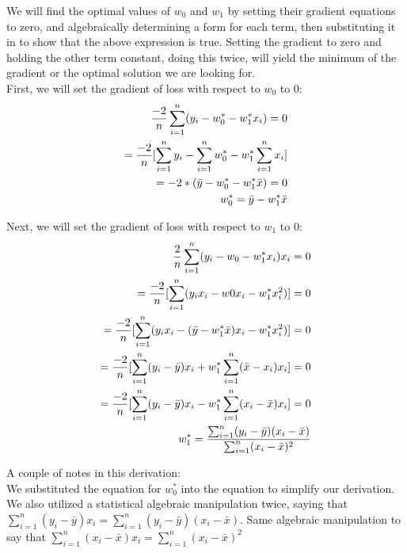 \documentclass[12pt]{article}
\begin{document}
\begin{enumerate}
\begin{enumerate}
We will find the optimal values of $w_0$ and $w_1$ by setting their gradient equations to zero, and algebraically determining a form for each term, then substituting it in to show that the above expression is true. Setting the gradient to zero and holding the other term constant, doing this twice, will yield the minimum of the gradient or the optimal solution we are looking for. \\ 

First, we will set the gradient of loss with respect to $w_0$ to 0: \\ 
\begin{align}
  \frac{-2}{n} \sum_{i=1}^{n} (y_i - w_0^* - w_1^*x_i) = 0 \notag \\ 
  = \frac{-2}{n} [\sum_{i=1}^{n} y_i - \sum_{i=1}^{n} w_0^* - w_1^* \sum_{i=1}^{n} x_i] \notag \\
  = -2 * (\bar{y} - w_0^* - w_1^* \bar{x}) = 0 \notag \\ 
  w_0^* = \bar{y} - w_1^* \bar{x} \notag
\end{align}

Next, we will set the gradient of loss with respect to $w_1$ to 0: \\ 
\begin{align}
  \frac{2}{n} \sum_{i=1}^{n} (y_i - w_0 - w_1^*x_i) x_i = 0 \notag \\ 
  = \frac{-2}{n} [\sum_{i=1}^{n} (y_ix_i - w0x_i - w_1^*x_i^2)] = 0 \notag \\ 
  = \frac{-2}{n} [\sum_{i=1}^{n} (y_ix_i - (\bar{y} - w_1^* \bar{x}) x_i - w_1^*x_i^2)] = 0  \notag \\ 
  = \frac{-2}{n} [\sum_{i=1}^{n} (y_i - \bar{y})x_i + w_1^* \sum_{i=1}^{n} (\bar{x} - x_i)x_i] = 0 \notag \\ 
  = \frac{-2}{n} [\sum_{i=1}^{n} (y_i - \bar{y})x_i - w_1^* \sum_{i=1}^{n} (x_i-\bar{x})x_i] = 0 \notag \\ 
  w_1^* = \frac{\sum_{i=1}^{n} (y_i - \bar{y})(x_i - \bar{x})}{\sum_{i=1}^{n} (x_i-\bar{x})^2} \notag
 \end{align}

 A couple of notes in this derivation: \\ 

 We substituted the equation for $w_0^*$ into the equation to simplify our derivation. We also utilized a statistical algebraic manipulation twice, 
 saying that $\sum_{i=1}^{n} (y_i - \bar{y})x_i = \sum_{i=1}^{n} (y_i - \bar{y})(x_i - \bar{x})$. Same algebraic manipulation to say that 
 $\sum_{i=1}^{n} (x_i - \bar{x})x_i = \sum_{i=1}^{n} (x_i - \bar{x})^2$\\ 


\end{enumerate}
\end{enumerate}
\end{document}
